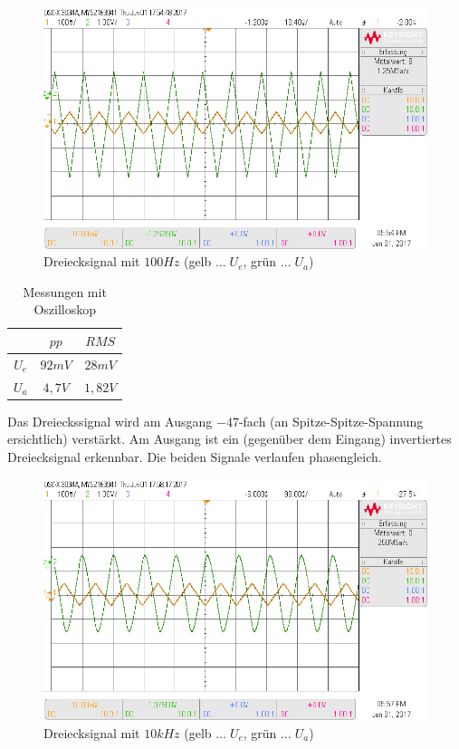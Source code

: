 \documentclass[12pt,a4paper,titlepage]{article}
\begin{document}
\begin{figure}[H]
  \centering
  \includegraphics[width=150mm]{scope_5.png}
  \caption{Dreiecksignal mit $100Hz$ (gelb $\hdots\;U_e$, grün $\hdots\;U_a$)}
\end{figure}

\begin{table}[H]
  \centering
  \begin{tabular}{c|c|c}
     & $pp$ & $RMS$ \\
     \hline
    $U_{e}$ & $92mV$ & $28mV$ \\
    \hline
    $U_{a}$ & $4,7V$ & $1,82V$
  \end{tabular}
  \caption{Messungen mit Oszilloskop}
\end{table}

\noindent Das Dreieckssignal wird am Ausgang $-47$-fach (an Spitze-Spitze-Spannung ersichtlich) verstärkt. Am Ausgang ist ein (gegenüber dem Eingang) invertiertes Dreiecksignal erkennbar. Die beiden Signale verlaufen phasengleich.

\begin{figure}[H]
  \centering
  \includegraphics[width=150mm]{scope_7.png}
  \caption{Dreiecksignal mit $10kHz$ (gelb $\hdots\;U_e$, grün $\hdots\;U_a$)}
\end{figure}
\end{document}
